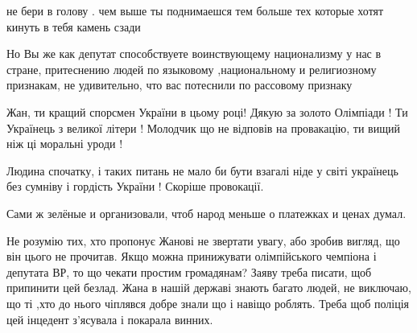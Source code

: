 \begin{itemize}
не бери в голову . чем выше ты поднимаешся тем больше тех которые хотят кинуть в тебя камень сзади

 

Но Вы же как депутат способствуете воинствующему национализму у нас в
стране, притеснению людей по языковому ,национальному и религиозному
признакам, не удивительно, что вас потеснили по рассовому признаку


 

Жан, ти кращий спорсмен України в цьому році! Дякую за золото Олімпіади ! Ти
Українець з великої літери ! Молодчик що не відповів на провакацію, ти вищий
ніж ці моральні уроди !


 

Людина спочатку, і таких питань не мало би бути взагалі ніде у світі українець
без сумніву і гордість України ! Скоріше провокації.


 

Сами ж зелёные и организовали, чтоб народ меньше о платежках и ценах думал.

 

Не розумію тих, хто пропонує Жанові не звертати увагу, або зробив вигляд, що він
цього не прочитав. Якщо можна принижувати олімпійського чемпіона і депутата
ВР, то що чекати простим громадянам? Заяву треба писати, щоб припинити цей
безлад. Жана в нашій державі знають багато людей, не виключаю, що ті ,хто до нього
чіплявся добре знали що і навіщо роблять. Треба щоб поліція цей інцедент
з'ясувала і покарала винних.



\end{itemize}
